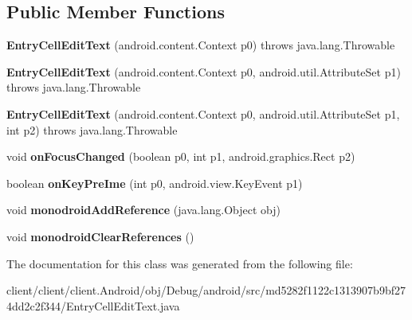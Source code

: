 \subsection*{Public Member Functions}
\begin{DoxyCompactItemize}
\item 
\hypertarget{classmd5282f1122c1313907b9bf274dd2c2f344_1_1EntryCellEditText_abc6d2fcfad4278c07fb9377db2a7134c}{}{\bfseries Entry\+Cell\+Edit\+Text} (android.\+content.\+Context p0)  throws java.\+lang.\+Throwable 	\label{classmd5282f1122c1313907b9bf274dd2c2f344_1_1EntryCellEditText_abc6d2fcfad4278c07fb9377db2a7134c}

\item 
\hypertarget{classmd5282f1122c1313907b9bf274dd2c2f344_1_1EntryCellEditText_a333a36d3d134c2021a6f1dbf0b9d7f73}{}{\bfseries Entry\+Cell\+Edit\+Text} (android.\+content.\+Context p0, android.\+util.\+Attribute\+Set p1)  throws java.\+lang.\+Throwable 	\label{classmd5282f1122c1313907b9bf274dd2c2f344_1_1EntryCellEditText_a333a36d3d134c2021a6f1dbf0b9d7f73}

\item 
\hypertarget{classmd5282f1122c1313907b9bf274dd2c2f344_1_1EntryCellEditText_a2e313fd9b5d97ca08457140cbd6d6347}{}{\bfseries Entry\+Cell\+Edit\+Text} (android.\+content.\+Context p0, android.\+util.\+Attribute\+Set p1, int p2)  throws java.\+lang.\+Throwable 	\label{classmd5282f1122c1313907b9bf274dd2c2f344_1_1EntryCellEditText_a2e313fd9b5d97ca08457140cbd6d6347}

\item 
\hypertarget{classmd5282f1122c1313907b9bf274dd2c2f344_1_1EntryCellEditText_a6ed3938ecff987e983a4b7cdacd5bc78}{}void {\bfseries on\+Focus\+Changed} (boolean p0, int p1, android.\+graphics.\+Rect p2)\label{classmd5282f1122c1313907b9bf274dd2c2f344_1_1EntryCellEditText_a6ed3938ecff987e983a4b7cdacd5bc78}

\item 
\hypertarget{classmd5282f1122c1313907b9bf274dd2c2f344_1_1EntryCellEditText_a4feba12d3919ee18f225f4d9a7812670}{}boolean {\bfseries on\+Key\+Pre\+Ime} (int p0, android.\+view.\+Key\+Event p1)\label{classmd5282f1122c1313907b9bf274dd2c2f344_1_1EntryCellEditText_a4feba12d3919ee18f225f4d9a7812670}

\item 
\hypertarget{classmd5282f1122c1313907b9bf274dd2c2f344_1_1EntryCellEditText_a5fe66eae31f0d4580ce9a9477bbf652e}{}void {\bfseries monodroid\+Add\+Reference} (java.\+lang.\+Object obj)\label{classmd5282f1122c1313907b9bf274dd2c2f344_1_1EntryCellEditText_a5fe66eae31f0d4580ce9a9477bbf652e}

\item 
\hypertarget{classmd5282f1122c1313907b9bf274dd2c2f344_1_1EntryCellEditText_a4362769b5400b38a07813cf469374965}{}void {\bfseries monodroid\+Clear\+References} ()\label{classmd5282f1122c1313907b9bf274dd2c2f344_1_1EntryCellEditText_a4362769b5400b38a07813cf469374965}

\end{DoxyCompactItemize}


The documentation for this class was generated from the following file\+:\begin{DoxyCompactItemize}
\item 
client/client/client.\+Android/obj/\+Debug/android/src/md5282f1122c1313907b9bf274dd2c2f344/Entry\+Cell\+Edit\+Text.\+java\end{DoxyCompactItemize}
